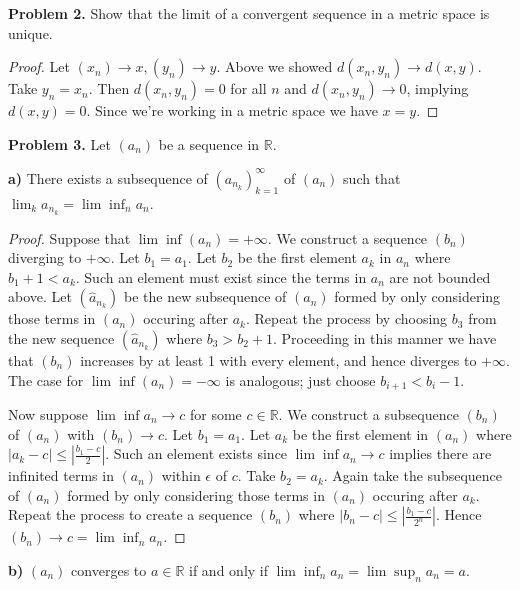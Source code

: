 \documentclass[12pt]{article}
\begin{document}

\textbf{Problem 2.}
Show that the limit of a convergent sequence in a metric space is unique.
\begin{proof}
Let $(x_n) \rightarrow x, (y_n) \rightarrow y$. Above we showed $d(x_n,
y_n) \rightarrow d(x, y)$. Take $y_n = x_n$. Then $d(x_n, y_n) = 0$ for all
$n$ and $d(x_n, y_n) \rightarrow 0$, implying $d(x, y) = 0$. Since we're
working in a metric space we have $x = y$.
\end{proof}


\textbf{Problem 3.}
Let $(a_n)$ be a sequence in $\mathbb{R}$.

\textbf{a)}
There exists a subsequence of $(a_{n_k})_{k=1}^{\infty}$ of $(a_n)$
such that $\lim_k a_{n_k} = \lim \inf_n a_n$.
\begin{proof}
Suppose that $\lim \inf (a_n) = +\infty$. We construct a sequence $(b_n)$
diverging to $+ \infty$. Let $b_1 = a_1$. Let $b_2$ be the first element
$a_k$ in $a_n$ where $b_1 + 1 < a_k$. Such an element must exist since the
terms in $a_n$ are not bounded above. Let $(\hat{a}_{n_k})$ be the new
subsequence of $(a_n)$ formed by only considering those terms in $(a_n)$
occuring after $a_k$. Repeat the process by choosing $b_3$ from the new
sequence $(\hat{a}_{n_k})$ where $b_3 > b_2 + 1$. Proceeding in this manner
we have that $(b_n)$ increases by at least 1 with every element, and hence
diverges to $+ \infty$. The case for $\lim \inf (a_n) = -\infty$ is
analogous; just choose $b_{i + 1} < b_{i} - 1$. 

Now suppose $\lim \inf a_n \rightarrow c$ for some $c \in \mathbb{R}$. We
construct a subsequence $(b_n)$ of $(a_n)$ with $(b_n) \rightarrow c$. Let
$b_1 = a_1$. Let $a_k$ be the first element in $(a_n)$ where $|a_k - c|
\leq |\frac{b_1 - c}{2}|$. Such an element exists since $\lim \inf a_n
\rightarrow c$ implies there are infinited terms in $(a_n)$ within
$\epsilon$
of $c$. Take $b_2 = a_k$. Again take the
subsequence of $(a_n)$ formed by only considering those terms in $(a_n)$
occuring after $a_k$. Repeat the process to create a sequence $(b_n)$ 
where $| b_n - c| \leq | \frac{b_1 - c}{2^n}|$. Hence $(b_n) \rightarrow c= \lim \inf_n a_n$.

\end{proof}

\textbf{b)}
$(a_n)$ converges to $a \in \mathbb{R}$ if and only if $\lim \inf_n a_n =
\lim \sup_n a_n = a$.
\end{document}

